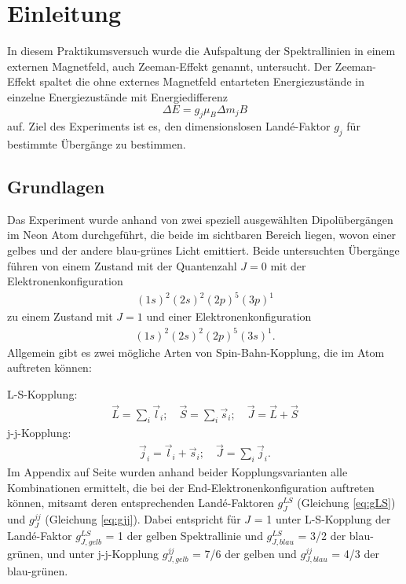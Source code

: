 \documentclass[a4paper,parskip,11pt, DIV12]{scrreprt}
\begin{document}
	
	\tableofcontents
	
		\chapter{Einleitung}
	
	In diesem Praktikumsversuch wurde die Aufspaltung der Spektrallinien in einem externen Magnetfeld, auch Zeeman-Effekt genannt, untersucht. Der Zeeman-Effekt spaltet die ohne externes Magnetfeld entarteten Energiezustände in einzelne Energiezustände mit Energiedifferenz
	\begin{equation}
	\label{Energiedifferenz}
	\Delta E = g_j \mu_B \Delta m_j B 
	\end{equation}
auf. Ziel des Experiments ist es, den dimensionslosen Landé-Faktor $g_j $ für bestimmte Übergänge zu bestimmen. 
	\section{Grundlagen}
	\label{sec:Grundlagen}
	Das Experiment wurde anhand von zwei speziell ausgewählten Dipolübergängen im Neon Atom durchgeführt, die beide im sichtbaren Bereich liegen, wovon einer gelbes und der andere blau-grünes Licht emittiert. Beide untersuchten Übergänge führen von einem Zustand mit der Quantenzahl $ J = 0 $ mit der Elektronenkonfiguration\begin{align*}
		(1s)^2(2s)^2(2p)^5(3p)^1	\end{align*}zu einem Zustand mit $J = 1$ und einer Elektronenkonfiguration \begin{align*}
		(1s)^2(2s)^2(2p)^5(3s)^1.
		\end{align*} 
		Allgemein gibt es zwei mögliche Arten von Spin-Bahn-Kopplung, die im Atom auftreten können: 
		
		L-S-Kopplung: \begin{align*}
		\vec{L} = \sum_i \vec{l}_i ; \quad \vec{S} = \sum_i \vec{s}_i ; \quad \vec{J} = \vec{L} + \vec{S}
		\end{align*}
		j-j-Kopplung: \begin{align*}
		\vec{j}_i = \vec{l}_i + \vec{s}_i ; \quad \vec{J} = \sum_i \vec{j}_i.
		\end{align*}
		Im Appendix auf Seite \pageref{ch:Appendix} wurden anhand beider Kopplungsvarianten alle Kombinationen ermittelt, die bei der End-Elektronenkonfiguration auftreten können, mitsamt deren entsprechenden Landé-Faktoren $g_J^{LS}$ (Gleichung \ref{eq:gLS}) und $g_J^{jj}$ (Gleichung \ref{eq:gjj}). Dabei entspricht für $J$ = 1 unter L-S-Kopplung der Landé-Faktor $g_{J,gelb}^{LS}$ = 1 der gelben Spektrallinie und $g_{J,blau}^{LS}$ = 3/2 der blau-grünen, und unter j-j-Kopplung $g_{J,gelb}^{jj}$ = 7/6 der gelben und $g_{J,blau}^{jj}$ = 4/3 der blau-grünen.
		
\end{document}
